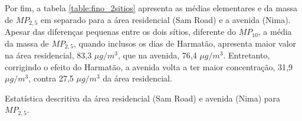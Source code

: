 Por fim, a tabela \ref{table:fino_2sitios} apresenta as médias elementares e
da massa de $MP_{2,5}$ em separado para a área residencial (Sam Road) e
a avenida (Nima). Apesar das diferenças pequenas entre os dois sítios, 
diferente do $MP_{10}$, a média da massa de $MP_{2,5}$, quando inclusos os dias
de Harmatão, apresenta maior valor na área residencial, 83,3 $\mu g / m^3$,
que na avenida, 76,4 $\mu g / m^3$. Entretanto, corrigindo o efeito do Harmatão,
a avenida volta a ter maior concentração, 31,9 $\mu g / m^3$, contra 27,5 
$\mu g / m^3$  da área residencial.

\begin{table}[H]
  \centering
    
  \caption{Estatística descritiva da área residencial (Sam Road) e avenida (Nima) 
           para $MP_{2,5}$. \label{table:fino_2sitios}}
\end{table}
